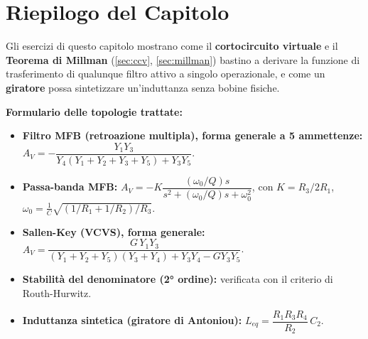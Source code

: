 \section*{Riepilogo del Capitolo}

\begin{important}
Gli esercizi di questo capitolo mostrano come il \textbf{cortocircuito virtuale} e il \textbf{Teorema di Millman} (\cref{sec:ccv}, \cref{sec:millman}) bastino a derivare la funzione di trasferimento di qualunque filtro attivo a singolo operazionale, e come un \textbf{giratore} possa sintetizzare un'induttanza senza bobine fisiche.
\end{important}

\begin{note}
\textbf{Formulario delle topologie trattate:}
\begin{itemize}
    \item \textbf{Filtro MFB (retroazione multipla), forma generale a 5 ammettenze:} $A_V = -\dfrac{Y_1 Y_3}{Y_4(Y_1+Y_2+Y_3+Y_5)+Y_3Y_5}$.
    \item \textbf{Passa-banda MFB:} $A_V = -K\dfrac{(\omega_0/Q)s}{s^2+(\omega_0/Q)s+\omega_0^2}$, con $K = R_3/2R_1$, $\omega_0 = \frac1C\sqrt{(1/R_1+1/R_2)/R_3}$.
    \item \textbf{Sallen-Key (VCVS), forma generale:} $A_V = \dfrac{G\,Y_1Y_3}{(Y_1+Y_2+Y_5)(Y_3+Y_4)+Y_3Y_4-GY_3Y_5}$.
    \item \textbf{Stabilità del denominatore (2° ordine):} verificata con il criterio di Routh-Hurwitz.
    \item \textbf{Induttanza sintetica (giratore di Antoniou):} $L_{eq} = \dfrac{R_1R_3R_4}{R_2}\,C_2$.
\end{itemize}
\end{note}

